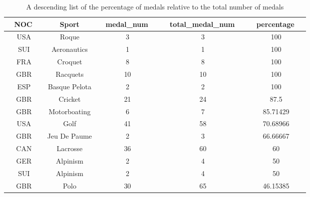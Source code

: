 \documentclass{mcmthesis}
\begin{document}
\begin{table}[H]
\centering
\caption{A descending list of the percentage of medals relative to the total number of medals}
\begin{tabular}{|c|c|c|c|c|} 
\hline
\textbf{~ NOC~~} & \textbf{Sport}        & \textbf{~ medal\_num~~} & \textbf{~ total\_medal\_num~~} & \textbf{~ percentage~~}  \\ 
\hline
USA              & Roque                 & 3                       & 3                              & 100                      \\ 
\hline
SUI              & Aeronautics           & 1                       & 1                              & 100                      \\ 
\hline
FRA              & Croquet               & 8                       & 8                              & 100                      \\ 
\hline
GBR              & Racquets              & 10                      & 10                             & 100                      \\ 
\hline
ESP              & Basque Pelota         & 2                       & 2                              & 100                      \\ 
\hline
GBR              & Cricket               & 21                      & 24                             & 87.5                     \\ 
\hline
GBR              & Motorboating          & 6                       & 7                              & 85.71429                 \\ 
\hline
USA              & Golf                  & 41                      & 58                             & 70.68966                 \\ 
\hline
GBR              & Jeu De Paume          & 2                       & 3                              & 66.66667                 \\ 
\hline
CAN              & Lacrosse              & 36                      & 60                             & 60                       \\ 
\hline
GER              & Alpinism              & 2                       & 4                              & 50                       \\ 
\hline
SUI              & Alpinism              & 2                       & 4                              & 50                       \\ 
\hline
GBR              & Polo                  & 30                      & 65                             & 46.15385                 \\ 

\end{tabular}
\end{table}
\end{document}
